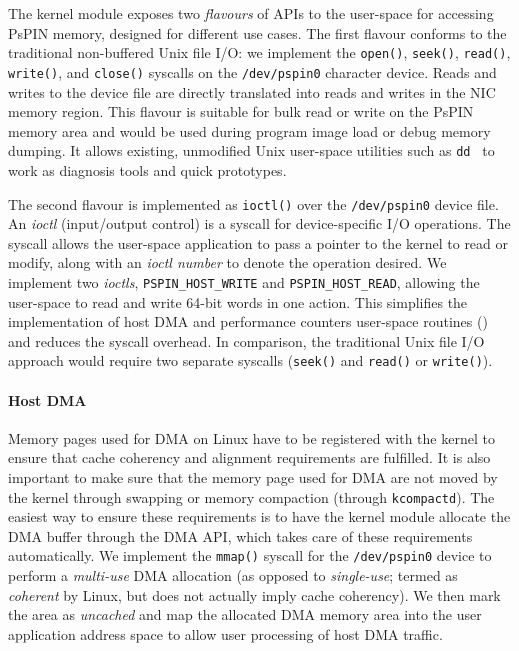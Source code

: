 The kernel module exposes two \emph{flavours} of APIs to the user-space for accessing PsPIN memory, designed for different use cases.  The first flavour conforms to the traditional non-buffered Unix file I/O: we implement the \texttt{open()}, \texttt{seek()}, \texttt{read()}, \texttt{write()}, and \texttt{close()} syscalls on the \texttt{/dev/pspin0} character device.  Reads and writes to the device file are directly translated into reads and writes in the NIC memory region.  This flavour is suitable for bulk read or write on the PsPIN memory area and would be used during program image load or debug memory dumping.  It allows existing, unmodified Unix user-space utilities such as \texttt{dd}~\cite{noauthor_ieee_2018} to work as diagnosis tools and quick prototypes.

The second flavour is implemented as \texttt{ioctl()} over the \texttt{/dev/pspin0} device file.  An \emph{ioctl} (input/output control) is a syscall for device-specific I/O operations.  The syscall allows the user-space application to pass a pointer to the kernel to read or modify, along with an \emph{ioctl number} to denote the operation desired.   We implement two \emph{ioctls}, \texttt{PSPIN\_\-HOST\_\-WRITE} and \texttt{PSPIN\_\-HOST\_\-READ}, allowing the user-space to read and write 64-bit words in one action.  This simplifies the implementation of host DMA and performance counters user-space routines () and reduces the syscall overhead.  In comparison, the traditional Unix file I/O approach would require two separate syscalls (\texttt{seek()} and \texttt{read()} or \texttt{write()}).

\paragraph{Host DMA} Memory pages used for DMA on Linux have to be registered with the kernel to ensure that cache coherency and alignment requirements are fulfilled.  It is also important to make sure that the memory page used for DMA are not moved by the kernel through swapping or memory compaction (through \texttt{kcompactd}).  The easiest way to ensure these requirements is to have the kernel module allocate the DMA buffer through the DMA API, which takes care of these requirements automatically.  We implement the \texttt{mmap()} syscall for the \texttt{/dev/pspin0} device to perform a \emph{multi-use} DMA allocation (as opposed to \emph{single-use}; termed as \emph{coherent} by Linux, but does not actually imply cache coherency).  We then mark the area as \emph{uncached} and map the allocated DMA memory area into the user application address space to allow user processing of host DMA traffic.

